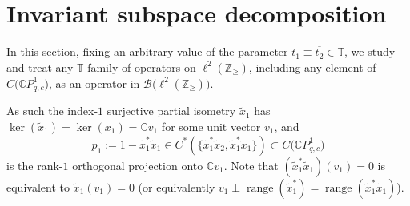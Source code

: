 \documentclass[pdftex]{sigma}
\begin{document}
\section{Invariant subspace decomposition}

In this section, fixing an arbitrary value of the parameter $t_{1}%
\equiv\overline{t_{2}}\in\mathbb{T}$, we study and treat any $\mathbb{T}%
$-family of operators on $\ell^{2} ( \mathbb{Z}_{\geq} ) $,
including any element of $C\big(\mathbb{C}P_{q,c}^{1}\big) $, as an
operator in $\mathcal{B}\big( \ell^{2} ( \mathbb{Z}_{\geq} )\big) $.

As such the index-$1$ surjective partial isometry $\tilde{x}_{1}$ has
$\ker ( \tilde{x}_{1} ) =\ker ( x_{1} ) =\mathbb{C}%
v_{1}$ for some unit vector $v_{1}$, and
\[
p_{1}:=1-\tilde{x}_{1}^{\ast}\tilde{x}_{1}\in C^{\ast} ( \{
\tilde{x}_{1}^{\ast}\tilde{x}_{2},\tilde{x}_{1}^{\ast}\tilde{x}_{1} \}
 ) \subset C\big(\mathbb{C}P_{q,c}^{1}\big)
\]
is the rank-$1$ orthogonal projection onto $\mathbb{C}v_{1}$. Note that
$ ( \tilde{x}_{1}^{\ast}\tilde{x}_{1} ) ( v_{1} ) =0$
is equivalent to $\tilde{x}_{1} ( v_{1} ) =0$ (or equivalently
$v_{1}\perp\operatorname{range} ( \tilde{x}_{1}^{\ast} )
=\operatorname{range} ( \tilde{x}_{1}^{\ast}\tilde{x}_{1} ) $).
\end{document}
